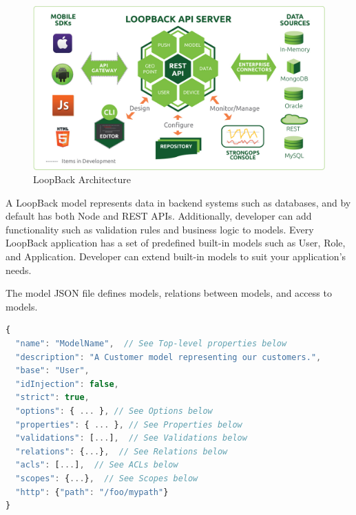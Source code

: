\begin {figure}[h]
\graphicspath{{images/chapter_TCH/}}
\includegraphics[width=\textwidth]{loopback_1}
\caption{LoopBack Architecture}
\end {figure}



A LoopBack model represents data in backend systems such as databases, and by default has both Node and REST APIs.  Additionally, developer can add functionality such as validation rules and business logic to models.
Every LoopBack application has a set of predefined built-in models such as User, Role, and Application.  Developer can extend built-in models to suit your application's needs.

The model JSON file defines models, relations between models, and access to models. 

\begin{lstlisting}[language=javascript]
{
  "name": "ModelName",  // See Top-level properties below
  "description": "A Customer model representing our customers.",
  "base": "User",
  "idInjection": false,
  "strict": true,
  "options": { ... }, // See Options below
  "properties": { ... }, // See Properties below
  "validations": [...],  // See Validations below
  "relations": {...},  // See Relations below
  "acls": [...],  // See ACLs below
  "scopes": {...},  // See Scopes below
  "http": {"path": "/foo/mypath"}
}
\end{lstlisting}


